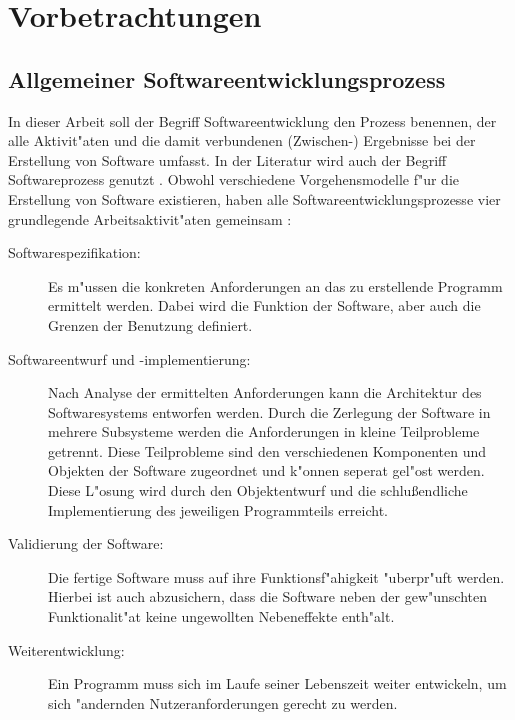 \chapter{Vorbetrachtungen}

\section{Allgemeiner Softwareentwicklungsprozess}
\label{sec:allgemeine_softwareentwicklung}

In dieser Arbeit soll der Begriff Softwareentwicklung den Prozess benennen, der alle Aktivit"aten und die damit verbundenen (Zwischen-) Ergebnisse bei der Erstellung von Software umfasst.
In der Literatur wird auch der Begriff Softwareprozess genutzt \cite{Sommerville2001a}.
Obwohl verschiedene Vorgehensmodelle f"ur die Erstellung von Software existieren, haben alle Softwareentwicklungsprozesse vier grundlegende Arbeitsaktivit"aten gemeinsam \cite{Brugge2004a,Sommerville2001a}:
\begin{description}
	\item[Softwarespezifikation:] Es m"ussen die konkreten Anforderungen an das zu erstellende Programm ermittelt werden.
								  Dabei wird die Funktion der Software, aber auch die Grenzen der Benutzung definiert.
	\item[Softwareentwurf und -implementierung:] Nach Analyse der ermittelten Anforderungen kann die Architektur des Softwaresystems entworfen werden.
												 Durch die Zerlegung der Software in mehrere Subsysteme werden die Anforderungen in kleine Teilprobleme getrennt.
												 Diese Teilprobleme sind den verschiedenen Komponenten und Objekten der Software zugeordnet und k"onnen seperat gel"ost werden.
												 Diese L"osung wird durch den Objektentwurf und die schlu\ss endliche Implementierung des jeweiligen Programmteils erreicht.
	\item[Validierung der Software:] Die fertige Software muss auf ihre Funktionsf"ahigkeit "uberpr"uft werden.
									 Hierbei ist auch abzusichern, dass die Software neben der gew"unschten Funktionalit"at keine ungewollten Nebeneffekte enth"alt.
	\item[Weiterentwicklung:] Ein Programm muss sich im Laufe seiner Lebenszeit weiter entwickeln, um sich "andernden Nutzeranforderungen gerecht zu werden.
\end{description}


